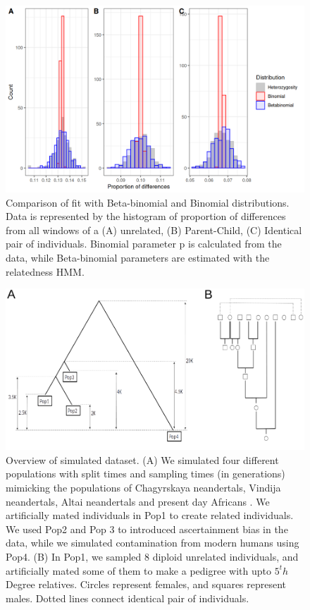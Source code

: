 \documentclass[12pt, letterpaper]{article}
\begin{document}
\begin{figure}[h!]
    \includegraphics[width=18cm]{supplementary_info/plots/binom.png}
    \centering
    \caption{Comparison of fit with Beta-binomial and Binomial distributions. Data is represented by the histogram of proportion of differences from all windows of a (A) unrelated, (B) Parent-Child, (C) Identical pair of individuals. Binomial parameter p is calculated from the data, while Beta-binomial parameters are estimated with the relatedness HMM.}
    \label{figS1:binom}
    
\end{figure}


\begin{figure}[h!]
    \includegraphics[width=18cm]{plots/inkscape_finalImg/pedigree_both.png}
    \centering
    \caption{Overview of simulated dataset. (A) We simulated four different populations with split times and sampling times (in generations) mimicking the populations of Chagyrskaya neandertals, Vindija neandertals, Altai neandertals and present day Africans \cite{mafessoni_high-coverage_2020}. We artificially mated individuals in Pop1 to create related individuals. We used Pop2 and Pop 3 to introduced ascertainment bias in the data, while we simulated contamination from modern humans using Pop4. (B) In Pop1, we sampled 8 diploid unrelated individuals, and artificially mated some of them to make a pedigree with upto $5^th$ Degree relatives. Circles represent females, and squares represent males. Dotted lines connect identical pair of individuals.}
    \label{figS10:pedigree}
    
\end{figure}
\end{document}
